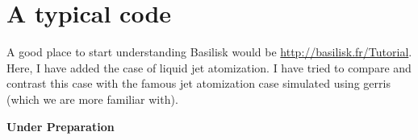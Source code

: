 \documentclass[]{article}
\newcommand\Colorhref[3][blue]{\href{#2}{\color{#1}#3}}
\begin{document}
\section{A typical code}
A good place to start understanding Basilisk would be \Colorhref{http://basilisk.fr/Tutorial}{http://basilisk.fr/Tutorial}. Here, I have added the case of liquid jet atomization. I have tried to compare and contrast this case with the famous jet atomization case simulated using gerris (which we are more familiar with).\\
\begin{center}
\textbf{\Huge Under Preparation}
\end{center}
\end{document}
